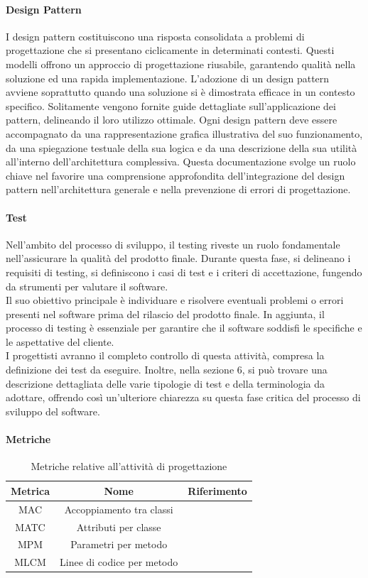 \paragraph{Design Pattern}
I design pattern costituiscono una risposta consolidata a problemi di progettazione che si presentano ciclicamente in determinati contesti. Questi modelli offrono un approccio di progettazione riusabile, garantendo qualità nella soluzione ed una rapida implementazione.
L'adozione di un design pattern avviene soprattutto quando una soluzione si è dimostrata efficace in un contesto specifico. Solitamente vengono fornite guide dettagliate sull'applicazione dei pattern, delineando il loro utilizzo ottimale.
Ogni design pattern deve essere accompagnato da una rappresentazione grafica illustrativa del suo funzionamento, da una spiegazione testuale della sua logica e da una descrizione della sua utilità all'interno dell'architettura complessiva. Questa documentazione svolge un ruolo chiave nel favorire una comprensione approfondita dell'integrazione del design pattern nell'architettura generale e nella prevenzione di errori di progettazione.

\paragraph{Test}
Nell'ambito del processo di sviluppo, il testing riveste un ruolo fondamentale nell'assicurare la qualità del prodotto finale. Durante questa fase, si delineano i requisiti di testing, si definiscono i casi di test e i criteri di accettazione, fungendo da strumenti per valutare il software. \\
Il suo obiettivo principale è individuare e risolvere eventuali problemi o errori presenti nel software prima del rilascio del prodotto finale. In aggiunta, il processo di testing è essenziale per garantire che il software soddisfi le specifiche e le aspettative del cliente. \\
I progettisti avranno il completo controllo di questa attività, compresa la definizione dei test da eseguire. Inoltre, nella sezione 6, si può trovare una descrizione dettagliata delle varie tipologie di test e della terminologia da adottare, offrendo così un'ulteriore chiarezza su questa fase critica del processo di sviluppo del software.

\paragraph{Metriche}
\begin{table}[H]
    \centering
    \begin{tabular}{|c|c|c|}
    \hline
    Metrica & Nome & Riferimento \\
    \hline \hline
    MAC & Accoppiamento tra classi &  \\
    MATC & Attributi per classe &  \\
    MPM & Parametri per metodo & \\
    MLCM & Linee di codice per metodo &  \\ 
    \hline
    \end{tabular}
    \caption{Metriche relative all'attività di progettazione}
\end{table}

